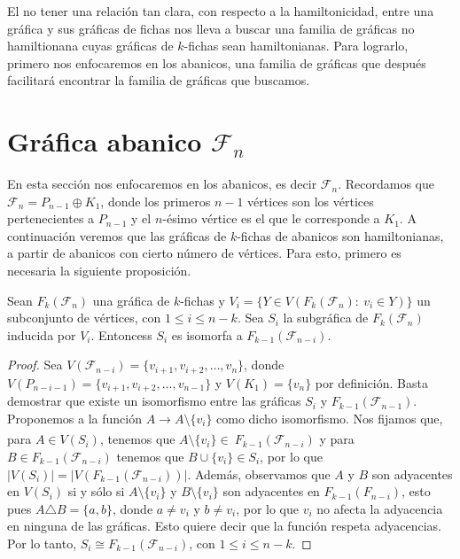 El no tener una relaci\'on tan clara, con respecto a la hamiltonicidad, entre
una gr\'afica y sus gr\'aficas de fichas nos lleva a buscar una familia de
gr\'aficas no hamiltionana cuyas gr\'aficas de $k$-fichas sean hamiltonianas.
Para lograrlo, primero nos enfocaremos en los abanicos, una familia de
gr\'aficas que despu\'es facilitar\'a encontrar la familia de gr\'aficas que
buscamos.

\section{Gr\'afica abanico \texorpdfstring{$\mathcal{F}_n$}{Fn}}%
\label{sec:SimpleFan}

En esta secci\'on nos enfocaremos en los abanicos, es decir $\mathcal{F}_n$.
Recordamos que $\mathcal{F}_n = P_{n-1} \oplus K_1$, donde los primeros $n-1$
v\'ertices son los v\'ertices pertenecientes a $P_{n-1}$ y el $n$-\'esimo
v\'ertice es el que le corresponde a $K_1$. A continuaci\'on veremos que las
gr\'aficas de $k$-fichas de abanicos son hamiltonianas, a partir de abanicos con
cierto n\'umero de v\'ertices. Para esto, primero es necesaria la siguiente
proposici\'on.

\begin{proposicion}
\label{prop:iso-SFan}
    Sean $F_k(\mathcal{F}_n)$ una gr\'afica de $k$-fichas y $V_i=\{ Y \in
    V(F_k(\mathcal{F}_n) \colon\ v_i \in Y) \}$ un subconjunto de v\'ertices,
    con $1 \leq i \leq n-k$. Sea $S_i$ la subgr\'afica de $F_k(\mathcal{F}_n)$
    inducida  por $V_i$. Entoncess $S_i$ es isomorfa a
    $F_{k-1}(\mathcal{F}_{n-i})$.
\end{proposicion}
    
\begin{proof}
    Sea $V(\mathcal{F}_{n-i}) = \{v_{i+1}, v_{i+2}, \dots, v_n\}$, donde
    $V(P_{n-i-1}) = \{v_{i+1}, v_{i+2}, \dots, v_{n-1}\}$ y $V(K_1)= \{v_n\}$
    por definici\'on. Basta demostrar que existe un isomorfismo entre las
    gr\'aficas $S_i$ y $F_{k-1}(\mathcal{F}_{n-1})$. Proponemos a la funci\'on
    $A \xrightarrow[]{} A \setminus \{v_i\}$ como dicho isomorfismo. Nos fijamos
    que, para $A \in V(S_i)$, tenemos que $A \setminus \{v_i\} \in \
    F_{k-1}(\mathcal{F}_{n-i})$ y para $B \in F_{k-1}(\mathcal{F}_{n-i})$
    tenemos que $B \cup \{v_i\} \in S_i$, por lo que
    $|V(S_i)|=|V(F_{k-1}(\mathcal{F}_{n-i}))|$. Adem\'as, observamos que $A$ y
    $B $ son adyacentes en $V(S_i)$ si y s\'olo si $A \setminus \{v_i\}$ y $B
    \setminus \{v_i\}$ son adyacentes en $F_{k-1}(F_{n-i})$, esto pues
    $A\triangle B = \{a,b\}$, donde $a\neq v_i$ y $b \neq v_i$, por lo que $v_i$
    no afecta la adyacencia en ninguna de las gr\'aficas. Esto quiere decir que
    la funci\'on respeta adyacencias. Por lo tanto, $S_i \cong
    F_{k-1}(\mathcal{F}_{n-i})$, con $1 \leq i \leq n-k$.
\end{proof}

